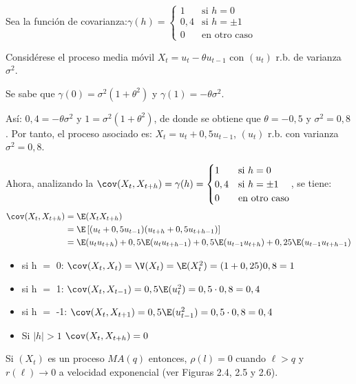 \begin{ejemplo}
 Sea la funci\'{o}n de covarianza:$\gamma (h)=\begin{cases}
     1& \text{si }h=0\\
     0,4& \text{si }h=\pm 1\\
     0 &\text{en otro caso}
    \end{cases}$

Consid\'{e}rese el proceso media m\'{o}vil $X_{{t}} =u_{{t}}-\theta u_{t-1} $ con $(u_{t} )$ r.b. de varianza $\sigma^{2}$.\newline

Se sabe que $\gamma (0)=\sigma^{2}(1+\theta^{2})$ y $\gamma (1)=-\theta \sigma^{2}$.\newline

As\'{i}: $0,4=-\theta \sigma^{2}$ y  $1= \sigma^{2}(1+\theta^{2})$, de donde se obtiene que $\theta =-0,5$ y $\sigma^{2}=0,8$. Por tanto, el proceso asociado es: $X_{t} =u_{t} +0,5u_{t-1}$, $(u_{t})$  r.b. con varianza $\sigma^{2}=0,8$.\newline

Ahora, analizando la $\cov(X_{t} ,X_{t+h} )=\gamma (h)=\begin{cases}
     1& \text{si }h=0\\
     0,4& \text{si }h=\pm 1\\
     0 &\text{en otro caso}
    \end{cases}$, se tiene:
\begin{align*}
 \cov(X_{t} ,X_{t+h} )&=\E(X_{t} X_{t+h} )\\
	 &=\E\left[ {(u_{t} +0,5u_{t-1} )(u_{t+h} +0,5u_{t+h-1} )} \right]\\
	 &=\E(u_{t} u_{t+h} )+0,5\E(u_{t} u_{t+h-1} )+0,5\E(u_{t-1} u_{t+h} )+0,25\E(u_{t-1} u_{t+h-1} )
\end{align*}

\begin{itemize}
\item si h $=$ 0: $\cov(X_{t} ,X_{t})=\V(X_{t} )=\E(X_{t}^{2} )=(1+0,25)0,8=1$
\item si h $=$ 1: $\cov(X_{t} ,X_{t-1} )=0,5\E(u_{t}^{2} )=0,5\cdot 0,8=0,4$
\item si h $=$ -1: $\cov(X_{t} ,X_{t+1} )=0,5\E(u_{t-1}^{2} )=0,5\cdot 0,8=0,4$
\item Si $\left| h \right|>1$ $\cov(X_{t} ,X_{t+h} )=0$
\end{itemize}
\end{ejemplo}

\begin{observacion}
 Si $(X_{t})$ es un proceso $MA(q)$ entonces, $\rho (l) = 0$ cuando $\ell > q$ y $r(\ell) \to 0$ a velocidad exponencial (ver Figuras 2.4, 2.5 y 2.6).
\end{observacion}


